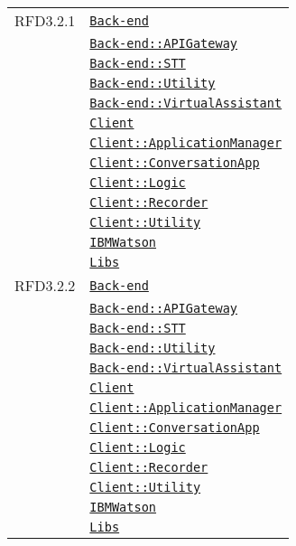 \begin{longtable}{|>{\centering}m{3cm}|m{10cm}<{\centering}|}
RFD3.2.1 & \hyperref[Back-end]{\texttt{Back-end}}\\
& \hyperref[Back-end::APIGateway]{\texttt{Back-end::APIGateway}}\\
& \hyperref[Back-end::STT]{\texttt{Back-end::STT}}\\
& \hyperref[Back-end::Utility]{\texttt{Back-end::Utility}}\\
& \hyperref[Back-end::VirtualAssistant]{\texttt{Back-end::VirtualAssistant}}\\
& \hyperref[Client]{\texttt{Client}}\\
& \hyperref[Client::ApplicationManager]{\texttt{Client::ApplicationManager}}\\
& \hyperref[Client::ConversationApp]{\texttt{Client::ConversationApp}}\\
& \hyperref[Client::Logic]{\texttt{Client::Logic}}\\
& \hyperref[Client::Recorder]{\texttt{Client::Recorder}}\\
& \hyperref[Client::Utility]{\texttt{Client::Utility}}\\
& \hyperref[IBMWatson]{\texttt{IBMWatson}}\\
& \hyperref[Libs]{\texttt{Libs}}\\ \hline

RFD3.2.2 & \hyperref[Back-end]{\texttt{Back-end}}\\
& \hyperref[Back-end::APIGateway]{\texttt{Back-end::APIGateway}}\\
& \hyperref[Back-end::STT]{\texttt{Back-end::STT}}\\
& \hyperref[Back-end::Utility]{\texttt{Back-end::Utility}}\\
& \hyperref[Back-end::VirtualAssistant]{\texttt{Back-end::VirtualAssistant}}\\
& \hyperref[Client]{\texttt{Client}}\\
& \hyperref[Client::ApplicationManager]{\texttt{Client::ApplicationManager}}\\
& \hyperref[Client::ConversationApp]{\texttt{Client::ConversationApp}}\\
& \hyperref[Client::Logic]{\texttt{Client::Logic}}\\
& \hyperref[Client::Recorder]{\texttt{Client::Recorder}}\\
& \hyperref[Client::Utility]{\texttt{Client::Utility}}\\
& \hyperref[IBMWatson]{\texttt{IBMWatson}}\\
& \hyperref[Libs]{\texttt{Libs}}\\ \hline


\end{longtable}
